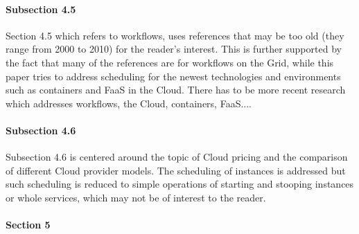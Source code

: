 
\paragraph{Subsection 4.5}

Section 4.5 which refers to workflows, uses references that may
be too old (they range from 2000 to 2010) for the reader's interest.
This is further supported by the fact that many of the references are
for workflows on the Grid, while this paper tries to address
scheduling for the newest technologies and environments such as
containers and FaaS in the Cloud. There has to be more recent research
which addresses workflows, the Cloud, containers, FaaS....





\paragraph{Subsection 4.6}

Subsection 4.6 is centered around the topic of Cloud pricing and the
comparison of different Cloud provider models. The scheduling of
instances is addressed but such scheduling is reduced to simple
operations of starting and stooping instances or whole services, which
may not be of interest to the reader.



\paragraph{Section 5}

